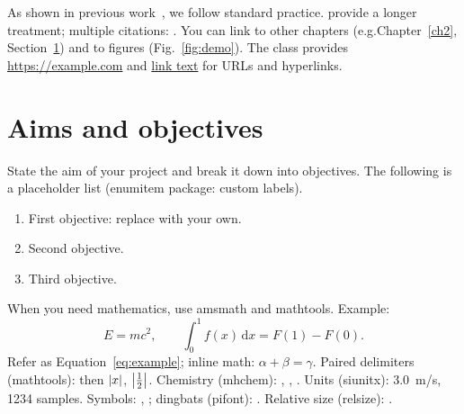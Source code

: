 As shown in previous work~\citep{example-paper}, we follow standard practice.
\citet{example-book} provide a longer treatment; multiple citations: \citep{example-paper,example-conf}. You can link to other chapters (e.g.\@ Chapter~\ref{ch2}, Section~\ref{sec:objectives}) and to figures (Fig.~\ref{fig:demo}). The class provides \url{https://example.com} and \href{https://example.com}{link text} for URLs and hyperlinks.


\section{Aims and objectives}\label{sec:objectives}

State the aim of your project and break it down into objectives. The following is a placeholder list (enumitem package: custom labels).

\begin{enumerate}[label=\textbf{O\arabic*:}, leftmargin=*]
  \item First objective: replace with your own.
  \item Second objective.
  \item Third objective.
\end{enumerate}

When you need mathematics, use amsmath and mathtools. Example:
\begin{equation}\label{eq:example}
  E = mc^2, \qquad \int_0^1 f(x)\,\mathrm{d}x = F(1) - F(0).
\end{equation}
Refer as Equation~\eqref{eq:example}; inline math: $\alpha + \beta = \gamma$. Paired delimiters (mathtools): \DeclarePairedDelimiter{\abs}{\lvert}{\rvert} then $\abs{x}$, $\abs*{\frac{1}{2}}$. Chemistry (mhchem): , , . Units (siunitx): \SI{3.0}{m/s}, \num{1234} samples. Symbols: \textdegree, \textcopyright; dingbats (pifont):  . Relative size (relsize):  .


